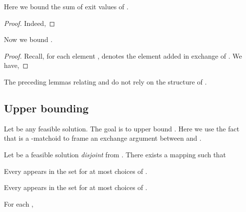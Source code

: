 \documentclass[oneside,letterpaper]{scrartcl} \usepackage{macros}
\begin{document}
Here we bound the sum of exit values of .
\begin{lemma}
  
\end{lemma}
\begin{proof}
  Indeed,
  
\end{proof}
Now we bound .
\begin{lemma}
  
\end{lemma}
\begin{proof}
  Recall, for each element  ,
   denotes the element added in exchange of
  . We have,
  
\end{proof}
\begin{remark}
  The preceding lemmas relating  and  do not
  rely on the structure of .
\end{remark}
\subsection{Upper bounding }
 Let  be any feasible solution. The goal is to
upper bound . Here we use the fact that 
is a -matchoid to frame an exchange argument between  and .


\begin{lemma}
  Let  be a feasible solution \emph{disjoint}
  from . There exists a mapping  such that
  \begin{results}
  \item Every  appears in the set  for at
    most  choices of .
  \item Every  appears in the set 
    for at most  choices of .
  \item For each ,
    
  \end{results}
\end{lemma}
\end{document}
